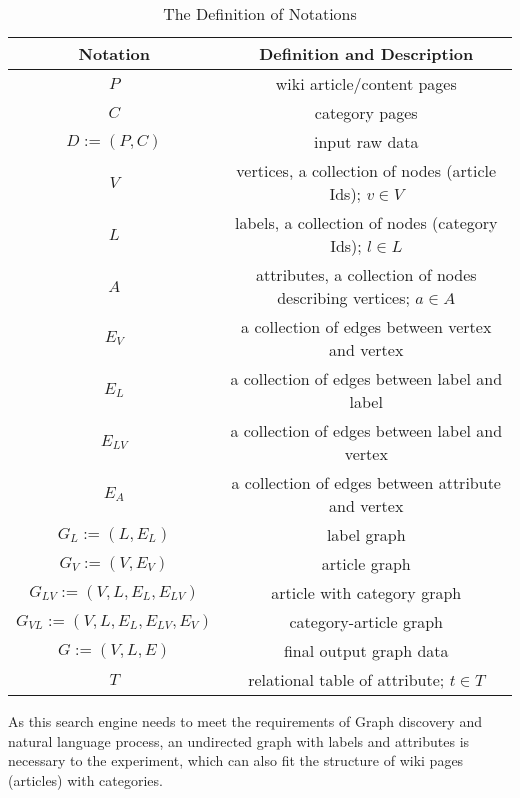 \begin{table*}[!tbp]
	\label{table:dos}	
	\begin{tabularx}{1.03\textwidth}{cc}
		\toprule
		Notation & Definition and Description \\\midrule\hline
		$P$ & wiki article/content pages \\\hline
		$C$ & category pages \\\hline
		$D := (P, C)$ & input raw data \\\hline
		$V$ & vertices, a collection of nodes (article Ids); $v \in V$ \\\hline
		$L$ & labels, a collection of nodes (category Ids); $l \in L$ \\\hline
		$A$ & attributes, a collection of nodes describing vertices; $a \in A$ \\\hline
		$E_V$ & a collection of edges between vertex and vertex \\\hline
		$E_L$ & a collection of edges between label and label \\\hline
		$E_{LV}$ & a collection of edges between label and vertex \\\hline
		$E_A$ & a collection of edges between attribute and vertex \\\hline
		$G_L := (L, E_L)$ & label graph \\\hline
		$G_V := (V, E_V)$ & article graph \\\hline
		$G_{LV} := (V, L, E_L, E_{LV})$ & article with category graph \\\hline
		$G_{VL} := (V, L, E_L, E_{LV}, E_V)$ & category-article graph \\\hline
		$G := (V, L, E)$ & final output graph data \\\hline
		$T$ & relational table of attribute; $t \in T$\\\bottomrule
	\end{tabularx}
	\vspace{-5pt}
	\caption{The Definition of Notations} 
	\vspace{-25pt}
\end{table*}
\vspace{-45pt}
As this search engine needs to meet the requirements of Graph discovery and natural language process, an undirected graph with labels and attributes is necessary to the experiment, which can also fit the structure of wiki pages (articles) with categories. \\
